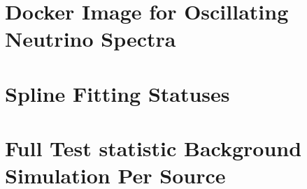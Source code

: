 \section{Docker Image for Oscillating Neutrino Spectra}\label{sec:apdx_nu_spec}


\clearpage

\section{Spline Fitting Statuses} \label{sec:apdx_nu_splines}

\begin{figure}[ht]
    \caption{}
    \label{fig:apdx_nu_splines}
\end{figure}

\clearpage
\section{Full Test statistic Background Simulation Per Source} \label{sec:apdx_TS_per_src}
